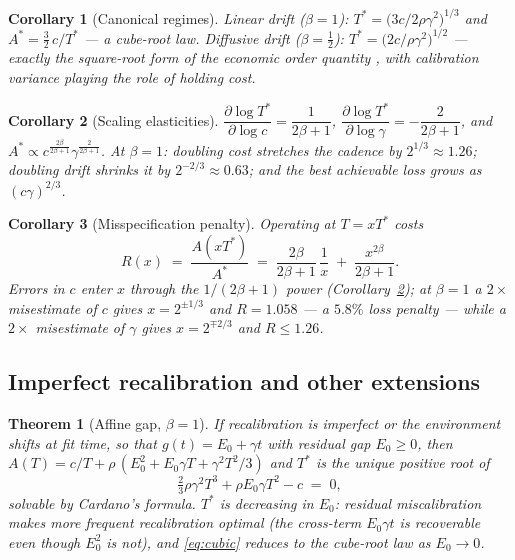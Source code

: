 \documentclass[conference]{IEEEtran}
\newtheorem{theorem}{Theorem}
\newtheorem{corollary}{Corollary}
\begin{document}
\begin{corollary}[Canonical regimes]
\label{cor:regimes}
Linear drift ($\beta=1$): $T^{*}=\big(3c/2\rho\gamma^{2}\big)^{1/3}$ and
$A^{*}=\tfrac32\,c/T^{*}$ --- a \emph{cube-root law}. Diffusive drift
($\beta=\tfrac12$): $T^{*}=\big(2c/\rho\gamma^{2}\big)^{1/2}$ --- exactly the
square-root form of the economic order quantity \cite{harris1913}, with
calibration variance playing the role of holding cost.
\end{corollary}

\begin{corollary}[Scaling elasticities]
\label{cor:scaling}
$\dfrac{\partial\log T^{*}}{\partial\log c}=\dfrac{1}{2\beta+1}$,\quad
$\dfrac{\partial\log T^{*}}{\partial\log\gamma}=-\dfrac{2}{2\beta+1}$,\quad
and $A^{*}\propto c^{\frac{2\beta}{2\beta+1}}\gamma^{\frac{2}{2\beta+1}}$.
At $\beta=1$: doubling cost stretches the cadence by $2^{1/3}\approx1.26$;
doubling drift shrinks it by $2^{-2/3}\approx0.63$; and the best achievable
loss grows as $(c\gamma)^{2/3}$.
\end{corollary}

\begin{corollary}[Misspecification penalty]
\label{cor:rob}
Operating at $T=xT^{*}$ costs
\begin{equation}
R(x)\;=\;\frac{A(xT^{*})}{A^{*}}
\;=\;\frac{2\beta}{2\beta+1}\,\frac1x\;+\;\frac{x^{2\beta}}{2\beta+1}.
\label{eq:penalty}
\end{equation}
Errors in $c$ enter $x$ through the $1/(2\beta+1)$ power
(Corollary~\ref{cor:scaling}); at $\beta{=}1$ a $2\times$ misestimate of $c$
gives $x=2^{\pm1/3}$ and $R=1.058$ --- a $5.8\%$ loss penalty --- while a
$2\times$ misestimate of $\gamma$ gives $x=2^{\mp2/3}$ and $R\le1.26$.
\end{corollary}

\subsection{Imperfect recalibration and other extensions}

\begin{theorem}[Affine gap, $\beta=1$]
\label{thm:affine}
If recalibration is imperfect or the environment shifts at fit time, so that
$g(t)=E_0+\gamma t$ with residual gap $E_0\ge0$, then
$A(T)=c/T+\rho\,(E_0^2+E_0\gamma T+\gamma^{2}T^{2}/3)$ and $T^{*}$ is the
unique positive root of
\begin{equation}
\tfrac{2}{3}\rho\gamma^{2}T^{3}+\rho E_0\gamma T^{2}-c\;=\;0,
\label{eq:cubic}
\end{equation}
solvable by Cardano's formula. $T^{*}$ is decreasing in $E_0$: residual
miscalibration makes \emph{more} frequent recalibration optimal (the
cross-term $E_0\gamma t$ is recoverable even though $E_0^2$ is not), and
\eqref{eq:cubic} reduces to the cube-root law as $E_0\to0$.
\end{theorem}
\end{document}

